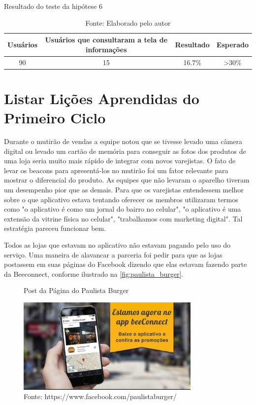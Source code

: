 \begin{table}[H]
\centering
\caption{Resultado do teste da hipótese 6}
\label{tab:resultado_6}
\begin{tabular}{|c|c|c|c|}
\hline
Usuários & Usuários que consultaram a tela de informações & Resultado & Esperado \\ \hline
90       & 15  & 16.7\%   & \textgreater 30\% \\ \hline
\end{tabular}
\caption* {Fonte: Elaborado pelo autor}    
\end{table}

\section{Listar Lições Aprendidas do Primeiro Ciclo}
\label{cha:listar_licoes_aprendidas}
Durante o mutirão de vendas a equipe notou que se tivesse levado uma câmera digital ou levado um cartão de memória para conseguir as fotos dos produtos de uma loja seria muito mais rápido de integrar com novos varejistas.
O fato de levar os beacons para apresentá-los no mutirão foi um fator relevante para mostrar o diferencial do produto. As equipes que não levaram o aparelho tiveram um desempenho pior que as demais.
Para que os varejistas entendessem melhor sobre o que aplicativo estava tentando oferecer os membros utilizaram termos como "o aplicativo é como um jornal do bairro no celular", "o aplicativo é uma extensão da vitrine física no celular", "trabalhamos com marketing digital". Tal estratégia pareceu funcionar bem.

Todos as lojas que estavam no aplicativo não estavam pagando pelo uso do serviço. Uma maneira de alavancar a parceria foi pedir para que as lojas postassem em suas páginas do Facebook dizendo que elas estavam fazendo parte da Beeconnect, conforme ilustrado na \autoref{fig:paulista_burger}.

\begin{figure}[H]
\caption{Post da Página do Paulista Burger}
\centerline{\includegraphics[width=0.8\textwidth]{img/paulista_burger}}
\label{fig:paulista_burger}
\caption* {Fonte: https://www.facebook.com/paulistaburger/}
\end{figure}

